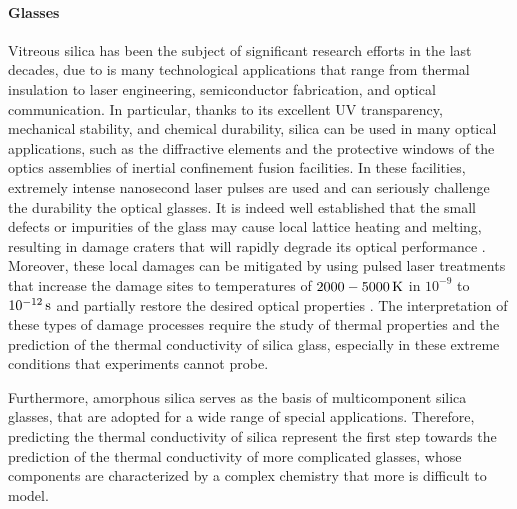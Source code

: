 \bigskip


\paragraph{Glasses}

Vitreous silica has been the subject of significant research efforts in the last decades, due to is many technological applications that range from thermal insulation to laser engineering, semiconductor fabrication, and optical communication.
In particular, thanks to its excellent UV transparency, mechanical stability, and chemical durability, silica can be used in many optical applications, such as the diffractive elements and the protective windows of the optics assemblies of inertial confinement fusion facilities. In these facilities, extremely intense nanosecond laser pulses are used and can seriously challenge the durability the optical glasses. It is indeed well established that the small defects or impurities of the glass may cause local lattice heating and melting, resulting in damage craters that will rapidly degrade its optical performance \cite{Miller2004,Canaud2004,Miller2010,Chambonneau2014,Kuzuu1999,Stuart1995,Wong2006,Carr2010,Saito2000}. Moreover, these local damages can be mitigated by using pulsed laser treatments that increase the damage sites to temperatures of $2000-5000\,\mathrm{K}$ in $10^{-9}$ to $10^{-12}\,\mathrm{s}$ and partially restore the desired optical properties \cite{Soules2011}. 
The interpretation of these types of damage processes require the study of thermal properties and the prediction of the thermal conductivity of silica glass, especially in these extreme conditions that experiments cannot probe.

Furthermore, amorphous silica serves as the basis of multicomponent silica glasses, that are adopted for a wide range of special applications. 
Therefore, predicting the thermal conductivity of silica represent the first step towards the prediction of the thermal conductivity of more complicated glasses, whose components are characterized by a complex chemistry that more is difficult to model.

